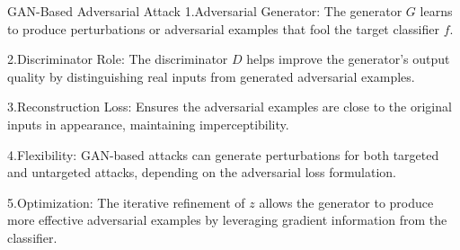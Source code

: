 GAN-Based Adversarial Attack
1.Adversarial Generator: The generator $G$ learns to produce perturbations or adversarial examples that fool the target classifier $f$.

2.Discriminator Role: The discriminator $D$ helps improve the generator's output quality by distinguishing real inputs from generated adversarial examples.

3.Reconstruction Loss: Ensures the adversarial examples are close to the original inputs in appearance, maintaining imperceptibility.

4.Flexibility: GAN-based attacks can generate perturbations for both targeted and untargeted attacks, depending on the adversarial loss formulation.

5.Optimization: The iterative refinement of $z$ allows the generator to produce more effective adversarial examples by leveraging gradient information from the classifier.